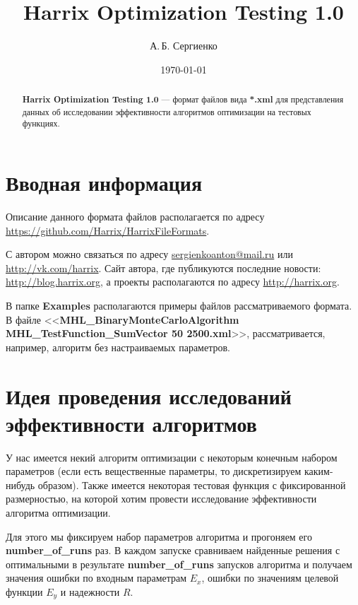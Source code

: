 \documentclass[a4paper,12pt]{article}
\title{Harrix Optimization Testing 1.0}
\author{А.\,Б. Сергиенко}
\date{\today}
\begin{document}


\maketitle

\begin{abstract}
\textbf{Harrix Optimization Testing 1.0} --- формат файлов вида \textbf{*.xml} для представления данных об исследовании эффективности алгоритмов оптимизации на тестовых функциях.
\end{abstract}

\tableofcontents

\newpage

\section{Вводная информация}

Описание данного формата файлов располагается по адресу \href {https://github.com/Harrix/HarrixFileFormats} {https://github.com/Harrix/HarrixFileFormats}.

С автором можно связаться по адресу \href {mailto:sergienkoanton@mail.ru} {sergienkoanton@mail.ru} или  \href {http://vk.com/harrix} {http://vk.com/harrix}. Сайт автора, где публикуются последние новости: \href {http://blog.harrix.org} {http://blog.harrix.org}, а проекты располагаются по адресу \href {http://harrix.org} {http://harrix.org}.

В папке \textbf{Examples} располагаются примеры файлов рассматриваемого формата. В файле <<\textbf{MHL\_BinaryMonteCarloAlgorithm MHL\_TestFunction\_SumVector 50 2500.xml}>>, рассматривается, например, алгоритм без настраиваемых параметров.

\section{Идея проведения исследований эффективности алгоритмов}

У нас имеется некий алгоритм оптимизации с некоторым конечным набором параметров (если есть вещественные параметры, то дискретизируем каким-нибудь образом). Также имеется некоторая тестовая функция с фиксированной размерностью, на которой хотим провести исследование эффективности алгоритма оптимизации.


Для этого мы фиксируем набор параметров алгоритма и прогоняем его \textbf{number\_of\_runs} раз. В каждом запуске сравниваем найденные решения с оптимальными в результате \textbf{number\_of\_runs} запусков алгоритма и  получаем значения ошибки по входным параметрам $ E_x $, ошибки по значениям целевой функции $ E_y $ и надежности $ R $.
\end{document}
